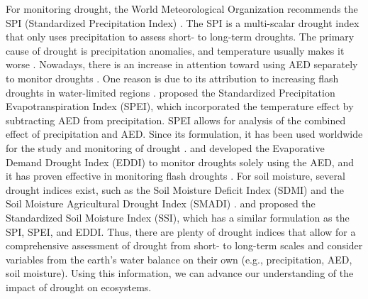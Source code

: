\documentclass[
  authoryear,
  preprint,
  3p,
  onecolumn]{elsarticle}
\begin{document}
For monitoring drought, the World Meteorological Organization recommends
the SPI (Standardized Precipitation Index) \citep{WMO2012}. The SPI is a
multi-scalar drought index that only uses precipitation to assess short-
to long-term droughts. The primary cause of drought is precipitation
anomalies, and temperature usually makes it worse \citep{Luo2017}.
Nowadays, there is an increase in attention toward using AED separately
to monitor droughts \citep{Vicente-Serrano2020}. One reason is due to
its attribution to increasing flash droughts in water-limited regions
\citep{Noguera2022}. \citet{Vicente-Serrano2010} proposed the
Standardized Precipitation Evapotranspiration Index (SPEI), which
incorporated the temperature effect by subtracting AED from
precipitation. SPEI allows for analysis of the combined effect of
precipitation and AED. Since its formulation, it has been used worldwide
for the study and monitoring of drought
\citep{Gebrechorkos2023, Liu2021}. \citet{Hobbins2016} and
\citet{McEvoy2016} developed the Evaporative Demand Drought Index (EDDI)
to monitor droughts solely using the AED, and it has proven effective in
monitoring flash droughts \citep{Li2024, Ford2023}. For soil moisture,
several drought indices exist, such as the Soil Moisture Deficit Index
(SDMI) \citep{Narasimhan2005} and the Soil Moisture Agricultural Drought
Index (SMADI) \citep{Souza2021}. \citet{Hao2013} and
\citet{AghaKouchak2014} proposed the Standardized Soil Moisture Index
(SSI), which has a similar formulation as the SPI, SPEI, and EDDI. Thus,
there are plenty of drought indices that allow for a comprehensive
assessment of drought from short- to long-term scales and consider
variables from the earth's water balance on their own (e.g.,
precipitation, AED, soil moisture). Using this information, we can
advance our understanding of the impact of drought on ecosystems.
\end{document}
